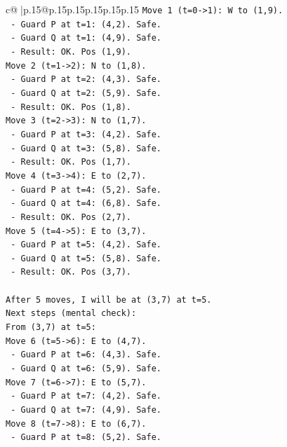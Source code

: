 \documentclass{article}
\begin{document}
{\begin{supertabular}{c@{$\;$}|p{.15\linewidth}@{}p{.15\linewidth}p{.15\linewidth}p{.15\linewidth}p{.15\linewidth}p{.15\linewidth}}
{{{\texttt{Move 1 (t=0{-}>1): W to (1,9).} \\
\texttt{  {-} Guard P at t=1: (4,2). Safe.} \\
\texttt{  {-} Guard Q at t=1: (4,9). Safe.} \\
\texttt{  {-} Result: OK. Pos (1,9).} \\
\texttt{Move 2 (t=1{-}>2): N to (1,8).} \\
\texttt{  {-} Guard P at t=2: (4,3). Safe.} \\
\texttt{  {-} Guard Q at t=2: (5,9). Safe.} \\
\texttt{  {-} Result: OK. Pos (1,8).} \\
\texttt{Move 3 (t=2{-}>3): N to (1,7).} \\
\texttt{  {-} Guard P at t=3: (4,2). Safe.} \\
\texttt{  {-} Guard Q at t=3: (5,8). Safe.} \\
\texttt{  {-} Result: OK. Pos (1,7).} \\
\texttt{Move 4 (t=3{-}>4): E to (2,7).} \\
\texttt{  {-} Guard P at t=4: (5,2). Safe.} \\
\texttt{  {-} Guard Q at t=4: (6,8). Safe.} \\
\texttt{  {-} Result: OK. Pos (2,7).} \\
\texttt{Move 5 (t=4{-}>5): E to (3,7).} \\
\texttt{  {-} Guard P at t=5: (4,2). Safe.} \\
\texttt{  {-} Guard Q at t=5: (5,8). Safe.} \\
\texttt{  {-} Result: OK. Pos (3,7).} \\
\\ 
\texttt{After 5 moves, I will be at (3,7) at t=5.} \\
\texttt{Next steps (mental check):} \\
\texttt{From (3,7) at t=5:} \\
\texttt{Move 6 (t=5{-}>6): E to (4,7).} \\
\texttt{  {-} Guard P at t=6: (4,3). Safe.} \\
\texttt{  {-} Guard Q at t=6: (5,9). Safe.} \\
\texttt{Move 7 (t=6{-}>7): E to (5,7).} \\
\texttt{  {-} Guard P at t=7: (4,2). Safe.} \\
\texttt{  {-} Guard Q at t=7: (4,9). Safe.} \\
\texttt{Move 8 (t=7{-}>8): E to (6,7).} \\
\texttt{  {-} Guard P at t=8: (5,2). Safe.} \\
}}}
\end{supertabular}}
\end{document}
